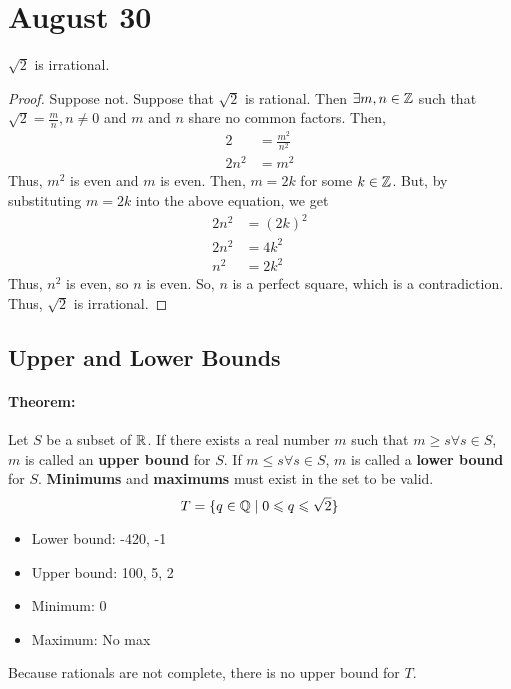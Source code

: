 \section{August 30}

\begin{theorem}{}{}
    $\sqrt{2}$ is irrational.
\end{theorem}
\begin{proof}
    Suppose not. Suppose that $\sqrt{2}$ is rational. Then $\exists m, n \in \mathbb{Z}$ such that $\sqrt{2} = \frac{m}{n}, n \neq 0$ and $m$ and $n$ share no common factors. Then,
    \begin{align*}
        2 &= \frac{m^2}{n^2} \\
        2n^2 &= m^2
    \end{align*}
    Thus, $m^2$ is even and $m$ is even. Then, $m = 2k$ for some $k \in \mathbb{Z}$. But, by substituting $m = 2k$ into the above equation, we get
    \begin{align*}
        2n^2 &= (2k)^2 \\
        2n^2 &= 4k^2 \\
        n^2 &= 2k^2
    \end{align*}
    Thus, $n^2$ is even, so $n$ is even. So, $n$ is a perfect square, which is a contradiction. Thus, $\sqrt{2}$ is irrational.
\end{proof}

\subsection{Upper and Lower Bounds}
\paragraph{Theorem:} Let $S$ be a subset of $\mathbb{R}$. If there exists a real number $m$ such that $m \geq s \forall s \in S$, $m$ is called an \textbf{upper bound} for $S$. If $m \leq s \forall s \in S$, $m$ is called a \textbf{lower bound} for $S$. \textbf{Minimums} and \textbf{maximums} must exist in the set to be valid.
$$T = \{q \in \mathbb{Q} \mid 0 \leqslant q \leqslant \sqrt{2}\}$$
\begin{itemize}
    \item Lower bound: -420, -1
    \item Upper bound: 100, 5, 2
    \item Minimum: 0
    \item Maximum: No max
\end{itemize}
Because rationals are not complete, there is no upper bound for $T$.


